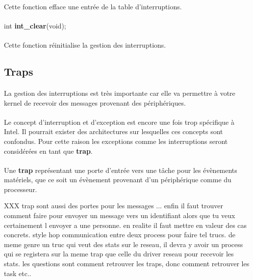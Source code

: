 \documentclass[10pt,a4wide]{article}
\begin{document}
\paragraph{}

Cette fonction efface une entr\'ee de la table d'interruptions.

\paragraph{}

\hspace{1.5cm}int \textbf{int\_clear}(void);

\paragraph{}

Cette fonction r\'einitialise la gestion des interruptions.

\subsection{Traps}

\paragraph{}

La gestion des interruptions est tr\`es importante car elle va permettre
\`a votre kernel de recevoir des messages provenant des p\'eriph\'eriques.

\paragraph{}

Le concept d'interruption et d'exception est encore une fois trop
sp\'ecifique \`a Intel. Il pourrait exister des architectures sur
lesquelles ces concepts sont confondus. Pour cette raison les exceptions
comme les interruptions seront consid\'er\'ees en tant que \textbf{trap}.

\paragraph{}

Une \textbf{trap} repr\'esentant une porte d'entr\'ee vers une t\^ache pour
les \'ev\`enements mat\'eriels, que ce soit un \'ev\`enement provenant
d'un p\'eriph\'erique comme du processeur.

XXX trap sont aussi des portes pour les messages ... enfin il faut trouver
    comment faire pour envoyer un message vers un identifiant alors que tu
    veux certainement l envoyer a une personne. en realite il faut mettre
    en valeur des cas concrets. style hop communication entre deux process
    pour faire tel trucs. de meme genre un truc qui veut des stats sur le
    reseau, il devra y avoir un process qui se registera sur la meme trap
    que celle du driver reseau pour recevoir les stats. les questions sont
    comment retrouver les traps, donc comment retrouver les task etc..
\end{document}
